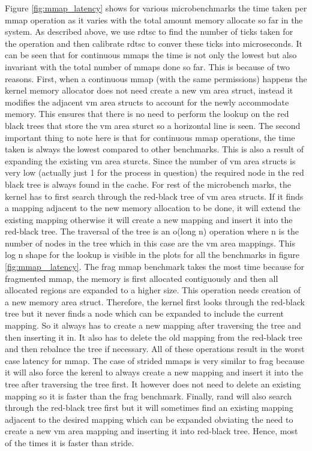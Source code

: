 \documentclass[twocolumn,11pt]{article}
\begin{document}
Figure \ref{fig:mmap_latency} shows for various microbenchmarks the time taken per mmap operation 
as it varies with the total amount memory allocate so far in the system. As described above, we use 
rdtsc to find the number of ticks taken for the operation and then calibrate rdtsc to conver
these ticks into microseconds. It can be seen that for continuous mmaps the time is not only the lowest
but also invariant with the total number of mmaps done so far. This is because of two reasons. First, 
when a continuous mmap (with the same permissions) happens the kernel memory allocator does not need 
create a new vm area struct, instead it modifies the adjacent vm area structs to account for the newly 
accommodate memory. This ensures that there is no need to perform the lookup on the red black trees that 
store the vm area sturct so a horizontal line is seen. The second important thing to note here is that 
for continuous mmap operations, the time taken is always the lowest compared to other benchmarks. This 
is also a result of expanding the existing vm area sturcts. Since the number of vm area structs is very 
low (actually just 1 for the process in question) the required node in the red black tree is always found in
the cache. For rest of the microbench marks, the kernel has to first search through the red-black tree of vm area
structs. If it finds a mapping adjacent to the new memory allocation to be done, it will extend the existing 
mapping otherwise it will create a new mapping and insert it into the red-black tree. The traversal of the 
tree is an o(long n) operation where n is the number of nodes in the tree which in this case are the vm area
mappings. This log n shape for the lookup is visible in the plots for all the benchmarks in figure \ref{fig:mmap_
latency}. The frag mmap benchmark takes the most time because for fragmented mmap, the memory is first 
allocated contiguously and then all allocated regions are expanded to a higher size. This operation needs creation
of a new memory area struct. Therefore, the kernel first looks through the red-black tree but it never finds 
a node which can be expanded to include the current mapping. So it always has to create a new mapping after 
traversing the tree and then inserting it in. It also has to delete the old mapping from the red-black tree
and then rebalnce the tree if necessary. All of these operations result in the worst case latency for mmap. 
The case of strided mmaps is very similar to frag because it will also force the kerenl to always create a new
mapping and insert it into the tree after traversing the tree first. It however does not need to delete an 
existing mapping so it is faster than the frag benchmark. Finally, rand will also search through the red-black 
tree first but it will sometimes find an existing mapping adjacent to the desired mapping which can be expanded
obviating the need to create a new vm area mapping and inserting it into red-black tree. Hence, most of the times
it is faster than stride. 
\end{document}
